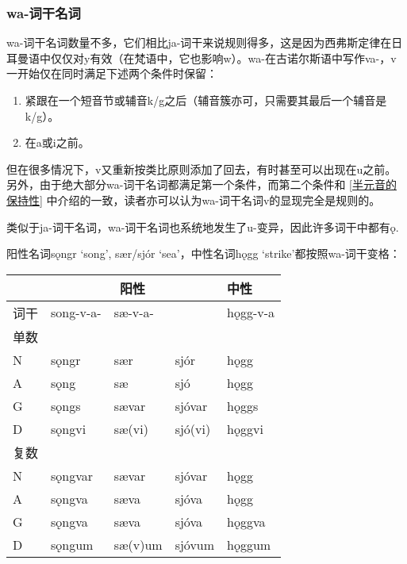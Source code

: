 \subsubsection{wa-词干名词}

wa-词干名词数量不多，它们相比ja-词干来说规则得多，这是因为西弗斯定律在日耳曼语中仅仅对y有效（在梵语中，它也影响w）。wa-在古诺尔斯语中写作va-，v一开始仅在同时满足下述两个条件时保留：

\begin{enumerate}
  \item
        紧跟在一个短音节或辅音k/g之后（辅音簇亦可，只需要其最后一个辅音是k/g）。
  \item
        在a或i之前。
\end{enumerate}

但在很多情况下，v又重新按类比原则添加了回去，有时甚至可以出现在u之前。另外，由于绝大部分wa-词干名词都满足第一个条件，而第二个条件和 \ref{半元音的保持性} 中介绍的一致，读者亦可以认为wa-词干名词v的显现完全是规则的。

类似于ja-词干名词，wa-词干名词也系统地发生了u-变异，因此许多词干中都有ǫ.

阳性名词sǫngr `song', sær/sjór `sea'，中性名词hǫgg
`strike'都按照wa-词干变格：

\begin{longtable}{lllll}
  \toprule
       & \multicolumn{3}{c}{\textbf{阳性}} & \textbf{中性}                      \\
  \midrule
  \endhead
  \bottomrule
  \endfoot
  词干 & song-v-a-                         & sæ-v-a-       &         & hǫgg-v-a \\
  单数 &                                   &               &         &          \\
  N    & sǫngr                             & sær           & sjór    & hǫgg     \\
  A    & sǫng                              & sæ            & sjó     & hǫgg     \\
  G    & sǫngs                             & sævar         & sjóvar  & hǫggs    \\
  D    & sǫngvi                            & sæ(vi)        & sjó(vi) & hǫggvi   \\
  复数 &                                   &               &         &          \\
  N    & sǫngvar                           & sævar         & sjóvar  & hǫgg     \\
  A    & sǫngva                            & sæva          & sjóva   & hǫgg     \\
  G    & sǫngva                            & sæva          & sjóva   & hǫggva   \\
  D    & sǫngum                            & sæ(v)um       & sjóvum  & hǫggum   \\
\end{longtable}

